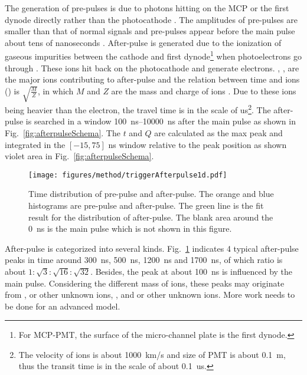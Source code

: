 The generation of pre-pulses is due to photons hitting on the MCP or the first dynode directly rather than the photocathode \cite{JUNOMassTesting}. The amplitudes of pre-pulses are smaller than that of normal signals and pre-pulses appear before the main pulse about tens of nanoseconds \cite{JUNOMassTesting}. After-pulse is generated due to the ionization of gaseous impurities between the cathode and first dynode\footnote{For MCP-PMT, the surface of the micro-channel plate is the first dynode.} when photoelectrons go through \cite{Coates_1973}. These ions hit back on the photocathode and generate electrons. , ,  are the major ions contributing to after-pulse and the relation between time and ions () is $\sqrt{\frac{M}{Z}}$, in which $M$ and $Z$ are the mass and charge of ions \cite{Coates_1973}. Due to these ions being heavier than the electron, the travel time is in the scale of \si{us}\footnote{The velocity of ions is about \SI{1000}{km/s} and size of PMT is about \SI{0.1}{m}, thus the transit time is in the scale of about \SI{0.1}{us}.}. The after-pulse is searched in a window \SIrange{100}{10000}{ns} after the main pulse as shown in Fig.~\ref{fig:afterpulseSchema}. The $t$ and $Q$ are calculated as the max peak and integrated in the $[-15,75]$ ns window relative to the peak position as shown violet area in Fig.~\ref{fig:afterpulseSchema}.

\begin{figure}[!htbp]
    \centering
    \texttt{[image: figures/method/triggerAfterpulse1d.pdf]}
    \caption{Time distribution of pre-pulse and after-pulse. The orange and blue histograms are pre-pulse and after-pulse. The green line is the fit result for the distribution of after-pulse. The blank area around the \SI{0}{ns} is the main pulse which is not shown in this figure.}
    \label{fig:afterpulse1d}
\end{figure}

After-pulse is categorized into several kinds. Fig.~\ref{fig:afterpulse1d} indicates 4 typical after-pulse peaks in time around \SI{300}{ns}, \SI{500}{ns}, \SI{1200}{ns} and \SI{1700}{ns}, of which ratio is about $1:\sqrt{3}:\sqrt{16}:\sqrt{32}$. Besides, the peak at about \SI{100}{ns} is influenced by the main pulse. Considering the different mass of ions, these peaks may originate from ,  or other unknown ions, , and  or other unknown ions. More work needs to be done for an advanced model.

